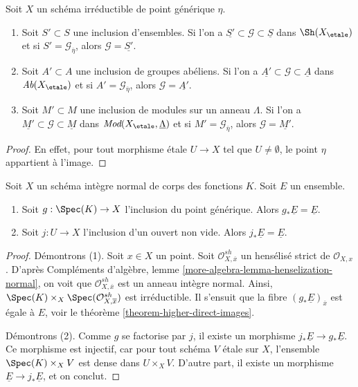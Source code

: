 \begin{lemma}
\label{lemma-irreducible-subsheaf-constant-zero}
Soit $X$ un schéma irréductible de point générique $\eta$.
\begin{enumerate}
\item Soit $S' \subset S$ une inclusion d'ensembles. Si l'on a
$\underline{S'} \subset \mathcal{G} \subset \underline{S}$
dans $\Sh(X_\etale)$ et si $S' = \mathcal{G}_{\overline{\eta}}$, alors
$\mathcal{G} = \underline{S'}$.
\item Soit $A' \subset A$ une inclusion de groupes abéliens. Si l'on a
$\underline{A'} \subset \mathcal{G} \subset \underline{A}$
dans $\textit{Ab}(X_\etale)$ et si $A' = \mathcal{G}_{\overline{\eta}}$, alors
$\mathcal{G} = \underline{A'}$.
\item Soit $M' \subset M$ une inclusion de modules sur un anneau $\Lambda$.
Si l'on a $\underline{M'} \subset \mathcal{G} \subset \underline{M}$
dans $\textit{Mod}(X_\etale, \underline{\Lambda})$
et si $M' = \mathcal{G}_{\overline{\eta}}$, alors
$\mathcal{G} = \underline{M'}$.
\end{enumerate}
\end{lemma}

\begin{proof}
En effet, pour tout morphisme \'etale $U \to X$
tel que $U \not = \emptyset$, le point $\eta$ appartient à l'image.
\end{proof}

\begin{lemma}
\label{lemma-push-constant-sheaf-from-open}
Soit $X$ un schéma intègre normal de corps des fonctions $K$.
Soit $E$ un ensemble.
\begin{enumerate}
\item Soit $g : \Spec(K) \to X$ l'inclusion du point générique.
Alors $g_*\underline{E} = \underline{E}$.
\item Soit $j : U \to X$ l'inclusion d'un ouvert non vide. Alors
$j_*\underline{E} = \underline{E}$.
\end{enumerate}
\end{lemma}

\begin{proof}
Démontrons (1). Soit $x \in X$ un point. Soit
$\mathcal{O}^{sh}_{X, \overline{x}}$
un hensélisé strict de $\mathcal{O}_{X, x}$. 
D'après Compléments d'algèbre, lemme \ref{more-algebra-lemma-henselization-normal},
on voit que $\mathcal{O}^{sh}_{X, \overline{x}}$ est un anneau intègre normal.
Ainsi, $\Spec(K) \times_X \Spec(\mathcal{O}^{sh}_{X, \overline{x}})$
est irréductible. Il s'ensuit que
la fibre $(g_*\underline{E})_{\overline{x}}$ est égale à $E$,
voir le théorème \ref{theorem-higher-direct-images}.

\medskip\noindent
Démontrons (2). Comme $g$ se factorise par $j$, il existe un morphisme
$j_*\underline{E} \to g_*\underline{E}$. Ce morphisme est injectif, car
pour tout schéma $V$ \'etale sur $X$, l'ensemble $\Spec(K) \times_X V$
est dense dans $U \times_X V$. D'autre part, il existe un morphisme
$\underline{E} \to j_*\underline{E}$, et on conclut.
\end{proof}

